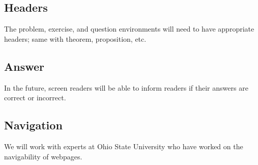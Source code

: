 \documentclass{ximera}
\begin{document}
\subsection{Headers}
The problem, exercise, and question environments will need to have appropriate headers; same with theorem, proposition, etc. 


\subsection{Answer}
In the future, screen readers will be able to inform readers if their answers are correct or incorrect.  

\subsection{Navigation}
We will work with experts at Ohio State University who have worked on the navigability of webpages. 
\end{document}
